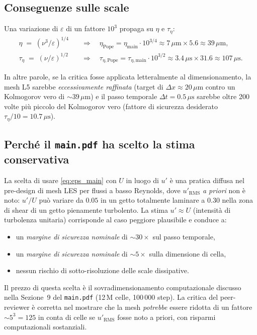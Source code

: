 \documentclass[11pt,a4paper]{article}
\newcommand{\mum}{\,\mu\mathrm{m}}
\newcommand{\mus}{\,\mu\mathrm{s}}
\begin{document}
\subsection{Conseguenze sulle scale}

Una variazione di $\varepsilon$ di un fattore $10^{3}$ propaga
su $\eta$ e $\tau_{\eta}$:
\begin{align}
  \eta \;=\; (\nu^{3}/\varepsilon)^{1/4}
    & \quad\Longrightarrow\quad \eta_{\mathrm{Pope}} = \eta_{\mathrm{main}} \cdot 10^{3/4}
        \approx 7\mum \times 5.6 \approx 39\mum,\\
  \tau_{\eta} \;=\; (\nu/\varepsilon)^{1/2}
    & \quad\Longrightarrow\quad \tau_{\eta,\mathrm{Pope}}
        = \tau_{\eta,\mathrm{main}} \cdot 10^{3/2}
        \approx 3.4\mus \times 31.6 \approx 107\mus.
\end{align}

In altre parole, se la critica fosse applicata letteralmente al
dimensionamento, la mesh L5 sarebbe \emph{eccessivamente raffinata}
(target di $\Delta x \approx 20\mum$ contro un Kolmogorov vero di
$\sim 39\mum$) e il passo temporale $\Delta t = 0.5\mus$ sarebbe
oltre 200 volte più piccolo del Kolmogorov vero (fattore di
sicurezza desiderato $\tau_{\eta}/10 = 10.7\mus$).

\subsection{Perché il \texttt{main.pdf} ha scelto la stima conservativa}

La scelta di usare \eqref{eq:eps_main} con $U$ in luogo di $u'$ è
una pratica diffusa nel pre-design di mesh LES per flussi a basso
Reynolds, dove $u'_{\mathrm{RMS}}$ \emph{a priori} non è noto:
$u'/U$ può variare da $0.05$ in un getto totalmente laminare a
$0.30$ nella zona di shear di un getto pienamente turbolento. La
stima $u'\approx U$ (intensità di turbolenza unitaria) corrisponde
al caso peggiore plausibile e conduce a:
\begin{itemize}
  \item un \emph{margine di sicurezza nominale} di $\sim 30\times$
    sul passo temporale,
  \item un \emph{margine di sicurezza nominale} di $\sim 5\times$
    sulla dimensione di cella,
  \item nessun rischio di sotto-risoluzione delle scale dissipative.
\end{itemize}

Il prezzo di questa scelta è il sovradimensionamento computazionale
discusso nella Sezione~9 del \texttt{main.pdf} (12\,M celle, 100\,000
step). La critica del peer-reviewer è corretta nel mostrare che la
mesh \emph{potrebbe} essere ridotta di un fattore $\sim 5^{3}=125$
in conta di celle se $u'_{\mathrm{RMS}}$ fosse noto a priori, con
risparmi computazionali sostanziali.
\end{document}
